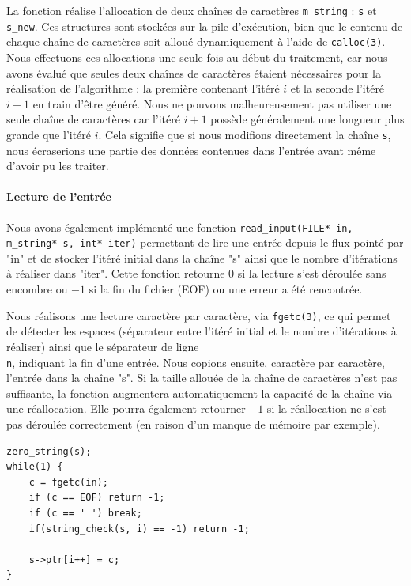 \documentclass[a4paper,11pt]{article}
\begin{document}
La fonction réalise l'allocation de deux chaînes de caractères \texttt{m\_string} : \texttt{s} et \texttt{s\_new}. Ces structures sont stockées sur la pile d'exécution, bien que le contenu de chaque chaîne de caractères soit alloué dynamiquement à l'aide de \texttt{calloc(3)}. Nous effectuons ces allocations une seule fois au début du traitement, car nous avons évalué que seules deux chaînes de caractères étaient nécessaires pour la réalisation de l'algorithme : la première contenant l'itéré $i$ et la seconde l'itéré $i+1$ en train d'être généré. Nous ne pouvons malheureusement pas utiliser une seule chaîne de caractères car l'itéré $i+1$ possède généralement une longueur plus grande que l'itéré $i$. Cela signifie que si nous modifions directement la chaîne \texttt{s}, nous écraserions une partie des données contenues dans l'entrée avant même d'avoir pu les traiter.

\paragraph*{Lecture de l'entrée}

Nous avons également implémenté une fonction \texttt{read\_input(FILE* in, m\_string* s, int* iter)} permettant de lire une entrée depuis le flux pointé par "in" et de stocker l'itéré initial dans la chaîne "s" ainsi que le nombre d'itérations à réaliser dans "iter". Cette fonction retourne $0$ si la lecture s'est déroulée sans encombre ou $-1$ si la fin du fichier (EOF) ou une erreur a été rencontrée.

Nous réalisons une lecture caractère par caractère, via \texttt{fgetc(3)}, ce qui permet de détecter les espaces (séparateur entre l'itéré initial et le nombre d'itérations à réaliser) ainsi que le séparateur de ligne \texttt{\\n}, indiquant la fin d'une entrée. Nous copions ensuite, caractère par caractère, l'entrée dans la chaîne "s". Si la taille allouée de la chaîne de caractères n'est pas suffisante, la fonction augmentera automatiquement la capacité de la chaîne via une réallocation. Elle pourra également retourner $-1$ si la réallocation ne s'est pas déroulée correctement (en raison d'un manque de mémoire par exemple).

\begin{verbatim}
zero_string(s);
while(1) {
    c = fgetc(in);
    if (c == EOF) return -1;
    if (c == ' ') break;
    if(string_check(s, i) == -1) return -1;
    
    s->ptr[i++] = c;
}
\end{verbatim}
\end{document}
